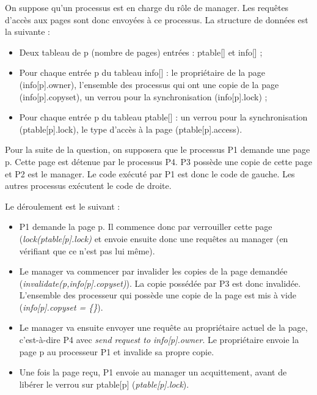 \documentclass[a4paper]{article}
\begin{document}
On suppose qu'un processus est en charge du rôle de manager. Les requêtes d'accès aux pages sont donc envoyées à ce processus. La structure de données est la suivante :
\begin{itemize}
\item Deux tableau de p (nombre de pages) entrées : ptable[] et info[] ;
\item Pour chaque entrée p du tableau info[] : le propriétaire de la page (info[p].owner), l'ensemble des processus qui ont une copie de la page (info[p].copyset), un verrou pour la synchronisation (info[p].lock) ;
\item Pour chaque entrée p du tableau ptable[] : un verrou pour la synchronisation (ptable[p].lock), le type d'accès à la page (ptable[p].access).
\end{itemize}

Pour la suite de la question, on supposera que le processus P1 demande une page p. Cette page est détenue par le processus P4. P3 possède une copie de cette page et P2 est le manager.
Le code exécuté par P1 est donc le code de gauche. Les autres processus exécutent le code de droite.


Le déroulement est le suivant :
\begin{itemize}
\item P1 demande la page p. Il commence donc par verrouiller cette page (\textit{lock(ptable[p].lock)} et envoie ensuite donc une requêtes au manager (en vérifiant que ce n'est pas lui même).
\item Le manager va commencer par invalider les copies de la page demandée (\textit{invalidate(p,info[p].copyset)}). La copie possédée par P3 est donc invalidée. L'ensemble des processeur qui possède une copie de la page est mis à vide (\textit{info[p].copyset = \{\}}).
\item Le manager va ensuite envoyer une requête au propriétaire actuel de la page, c'est-à-dire P4 avec \textit{send request to info[p].owner}. Le propriétaire envoie la page p au processeur P1 et invalide sa propre copie.
\item Une fois la page reçu, P1 envoie au manager un acquittement, avant de libérer le verrou sur ptable[p] (\textit{ptable[p].lock}).
\end{itemize}
\end{document}
